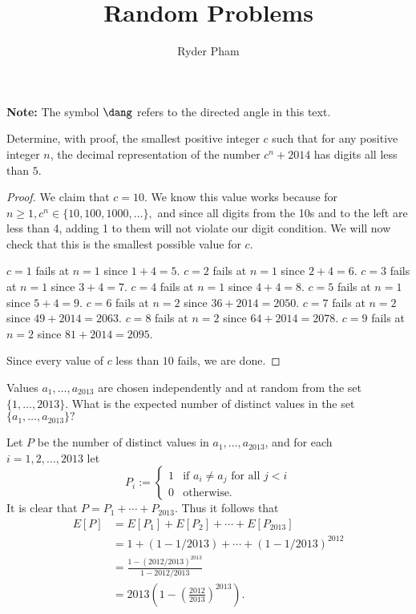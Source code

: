 \documentclass[letterpaper,oneside]{scrartcl}
\begin{document}
\title{Random Problems}
\author{Ryder Pham}
\maketitle

\textbf{Note:} The symbol $\dang$ refers to the directed angle in this text. 

\begin{problem*}
    Determine, with proof, the smallest positive integer $c$ such that for any positive integer $n$, the decimal representation of the number $c^n + 2014$ has digits all less than $5$.
\end{problem*}
\begin{proof}
  We claim that $c=10.$ We know this value works because for $n\geq 1, c^n \in \{10,100,1000,\dots\},$ and since all digits from the 10s and to the left are less than 4, adding 1 to them will not violate our digit condition. We will now check that this is the smallest possible value for $c.$ 
  \begin{itemize}
    \ii $c=1$ fails at $n=1$ since $1+4=5.$
    \ii $c=2$ fails at $n=1$ since $2+4=6.$
    \ii $c=3$ fails at $n=1$ since $3+4=7.$
    \ii $c=4$ fails at $n=1$ since $4+4=8.$
    \ii $c=5$ fails at $n=1$ since $5+4=9.$
    \ii $c=6$ fails at $n=2$ since $36+2014=2050.$
    \ii $c=7$ fails at $n=2$ since $49+2014=2063.$
    \ii $c=8$ fails at $n=2$ since $64+2014=2078.$
    \ii $c=9$ fails at $n=2$ since $81+2014=2095.$
  \end{itemize}
  Since every value of $c$ less than $10$ fails, we are done. 
\end{proof}
\begin{problem*}
  Values $a_1,\dots,a_{2013}$ are chosen independently and at random from the set $\{1,\dots,2013\}.$ What is the expected number of distinct values in the set $\{a_1,\dots,a_{2013}\}?$
\end{problem*}
\begin{soln}
  Let $P$ be the number of distinct values in ${a_1,\dots,a_{2013}}$, and for each $i=1,2,\dots,2013$ let
  $$
  P_i :=
  \begin{cases}
    1 & \text{if } a_i \neq a_j \text{ for all } j < i\\
    0 & \text{otherwise.}
  \end{cases}
  $$
  It is clear that $P = P_1+\cdots+P_{2013}.$ Thus it follows that 
  \begin{align*}
    E[P]&=E[P_1]+E[P_2]+\cdots+E[P_{2013}] \\
    &= 1+(1-1/2013)+\cdots+(1-1/2013)^{2012}\\
    &= \frac{1-(2012/2013)^{2013}}{1-2012/2013}\\
    &= 2013\left(1-\left(\frac{2012}{2013}\right)^{2013}\right).
  \end{align*}
\end{soln}
\end{document}
